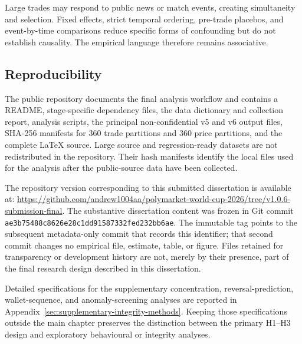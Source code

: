 Large trades may respond to public news or match events, creating simultaneity
and selection. Fixed effects, strict temporal ordering, pre-trade placebos, and
event-by-time comparisons reduce specific forms of confounding but do not
establish causality. The empirical language therefore remains associative.

\subsection{Reproducibility}

The public repository documents the final analysis workflow and contains a
README, stage-specific dependency files, the data dictionary and collection
report, analysis scripts, the principal non-confidential v5 and v6 output
files, SHA-256 manifests for 360 trade partitions and 360 price partitions,
and the complete LaTeX source. Large source and regression-ready datasets are
not redistributed in the repository. Their hash manifests identify the local
files used for the analysis after the public-source data have been collected.

The repository version corresponding to this submitted dissertation is
available at:
\url{https://github.com/andrew1004aa/polymarket-world-cup-2026/tree/v1.0.6-submission-final}.
The substantive dissertation content was frozen in Git commit
\texttt{ae3b75488c8626e28c1dd91587332fed232bb6ae}. The immutable tag points
to the subsequent metadata-only commit that records this identifier; that
second commit changes no empirical file, estimate, table, or figure.
Files retained for transparency or development history are not, merely by
their presence, part of the final research design described in this
dissertation.

Detailed specifications for the supplementary concentration,
reversal-prediction, wallet-sequence, and anomaly-screening analyses are reported in
Appendix~\ref{sec:supplementary-integrity-methods}. Keeping those specifications
outside the main chapter preserves the distinction between the primary H1--H3
design and exploratory behavioural or integrity analyses.
